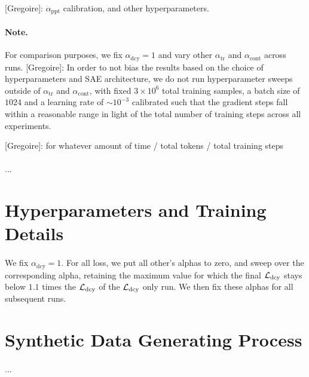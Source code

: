 \documentclass{article}
\newcommand{\greg}[1]{{\color{indigo}[Gregoire]: #1}}
\begin{document}
\greg{$\alpha_{\mathrm{ppt}}$ calibration, and other hyperparameters.}

\paragraph{Note.} For comparison purposes, we fix $\alpha_{\mathrm{dcy}} = 1$ and vary other $\alpha_{\mathrm{tr}}$ and $\alpha_{\mathrm{cont}}$ across runs. \greg{In order to not bias the results based on the choice of hyperparameters and SAE architecture, we do not run hyperparameter sweeps outside of $\alpha_{\mathrm{tr}}$ and $\alpha_{\mathrm{cont}}$, with fixed $3\times 10^6$ total training samples, a batch size of $1024$ and a learning rate of $\sim 10^{-3}$ calibrated such that the gradient steps fall within a reasonable range in light of the total number of training steps across all experiments.}

\greg{for whatever amount of time / total tokens / total training steps}

\paragraph{} ...

\section{Hyperparameters and Training Details}

\paragraph{} We fix $\alpha_{\mathrm{dcy}} = 1$. For all loss, we put all other's alphas to zero, and sweep over the corresponding alpha, retaining the maximum value for which the final $\mathcal{L}_{\mathrm{dcy}}$ stays below $1.1$ times the $\mathcal{L}_{\mathrm{dcy}}$ of the $\mathcal{L}_{\mathrm{dcy}}$ only run. We then fix these alphas for all subsequent runs.

\section{Synthetic Data Generating Process}

\paragraph{} ...

\section{\InterVench}
\end{document}
